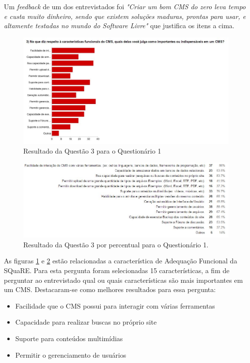 Um \textit{feedback} de um dos entrevistados foi \textit{"Criar um bom CMS do zero leva tempo e custa muito dinheiro, sendo que existem soluções maduras, prontas para usar, e altamente testadas no mundo do Software Livre"} que justifica os itens a cima.


\begin{figure}[!h]
\centering
\includegraphics[keepaspectratio=true,scale=0.55]{figuras/Ques_1/q3.jpg}
\caption{Resultado da Questão 3 para o Questionário 1}
\label{Q3_Q3_1}
\end{figure}

\begin{figure}[h]
\centering
\includegraphics[keepaspectratio=true,scale=0.7]{figuras/Ques_1/q3_1.jpg}
\caption{Resultado da Questão 3 por percentual para o Questionário 1.}
\label{Q3_Q3}
\end{figure}



As figuras \ref{Q3_Q3_1} e \ref{Q3_Q3} estão relacionadas a característica de Adequação Funcional da SQuaRE. Para esta pergunta foram selecionadas 15 características, a fim de perguntar ao entrevistado qual ou quais características são mais importantes em um CMS. Destacaram-se como melhores resultados para essa pergunta:  

    \begin{itemize}
    \item Facilidade que o CMS possui para interagir com várias ferramentas
    \item Capacidade para realizar buscas no próprio site
    \item Suporte para conteúdos multimídias
    \item Permitir o gerenciamento de usuários
    
    \end{itemize}

